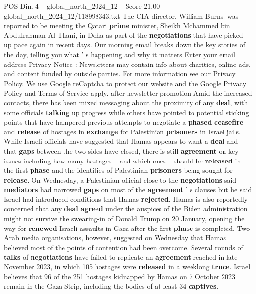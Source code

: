 \begin{textsample}{POS Dim 4 – global\_north\_2024\_12 – Score 21.00 – global\_north\_2024\_12/118998343.txt}
The CIA director, William Burns, was reported to be meeting the Qatari \textbf{prime} minister, Sheikh Mohammed bin Abdulrahman Al Thani, in Doha as part of the \textbf{negotiations} that have picked up pace again in recent days.
Our morning email breaks down the key stories of the day, telling you what ' s happening and why it matters Enter your email address Privacy Notice : Newsletters may contain info about charities, online ads, and content funded by outside parties.
For more information see our Privacy Policy.
We use Google reCaptcha to protect our website and the Google Privacy Policy and Terms of Service apply. after newsletter promotion Amid the increased contacts, there has been mixed messaging about the proximity of any \textbf{deal}, with some officials \textbf{talking} up progress while others have pointed to potential sticking points that have hampered previous attempts to negotiate a \textbf{phased} \textbf{ceasefire} and \textbf{release} of hostages in \textbf{exchange} for Palestinian \textbf{prisoners} in Israel jails.
While Israeli officials have suggested that Hamas appears to want a \textbf{deal} and that \textbf{gaps} between the two sides have closed, there is still \textbf{agreement} on key issues including how many hostages -- and which ones -- should be \textbf{released} in the first \textbf{phase} and the identities of Palestinian \textbf{prisoners} being sought for \textbf{release}.
On Wednesday, a Palestinian official close to the \textbf{negotiations} said \textbf{mediators} had narrowed \textbf{gaps} on most of the \textbf{agreement} ' s clauses but he said Israel had introduced conditions that Hamas \textbf{rejected}.
Hamas is also reportedly concerned that any \textbf{deal} \textbf{agreed} under the auspices of the Biden administration might not survive the swearing-in of Donald Trump on 20 January, opening the way for \textbf{renewed} Israeli assaults in Gaza after the first \textbf{phase} is completed.
Two Arab media organisations, however, suggested on Wednesday that Hamas believed most of the points of contention had been overcome.
Several rounds of \textbf{talks} of \textbf{negotiations} have failed to replicate an \textbf{agreement} reached in late November 2023, in which 105 hostages were \textbf{released} in a weeklong \textbf{truce}.
Israel believes that 96 of the 251 hostages kidnapped by Hamas on 7 October 2023 remain in the Gaza Strip, including the bodies of at least 34 \textbf{captives}.

\end{textsample}
